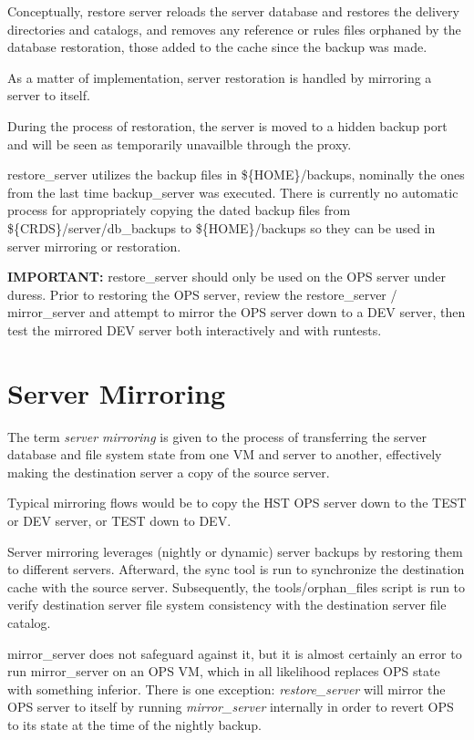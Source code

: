 \documentclass[letterpaper,10pt,english]{sphinxmanual}
\begin{document}
Conceptually,  restore server reloads the server database and restores the delivery directories and catalogs,  and
removes any reference or rules files orphaned by the database restoration,  those added to the cache since the backup
was made.

As a matter of implementation,  server restoration is handled by mirroring a server to itself.

During the process of restoration,  the server is moved to a hidden backup port and will be seen as temporarily
unavailble through the proxy.

restore\_server utilizes the backup files in \$\{HOME\}/backups,  nominally the ones from the last time backup\_server was
executed.   There is currently no automatic process for appropriately copying the dated backup files from
\$\{CRDS\}/server/db\_backups to \$\{HOME\}/backups so they can be used in server mirroring or restoration.

\textbf{IMPORTANT:}  restore\_server should only be used on the OPS server under duress.   Prior to restoring the OPS server,
review the restore\_server / mirror\_server and attempt to mirror the OPS server down to a DEV server,  then test the
mirrored DEV server both interactively and with runtests.


\section{Server Mirroring}
\label{server_guide:server-mirroring}
The term \emph{server mirroring} is given to the process of transferring the server database and file system state from one
VM and server to another,  effectively making the destination server a copy of the source server.

Typical mirroring flows would be to copy the HST OPS server down to the TEST or DEV server,  or TEST down to DEV.

Server mirroring leverages (nightly or dynamic) server backups by restoring them to different servers.  Afterward,
the sync tool is run to synchronize the destination cache with the source server.   Subsequently,  the tools/orphan\_files
script is run to verify destination server file system consistency with the destination server file catalog.

mirror\_server does not safeguard against it,  but it is almost certainly an error to run mirror\_server on an
OPS VM,  which in all likelihood replaces OPS state with something inferior.   There is one exception:  \emph{restore\_server}
will mirror the OPS server to itself by running \emph{mirror\_server} internally in order to revert OPS to its state at the
time of the nightly backup.
\end{document}

